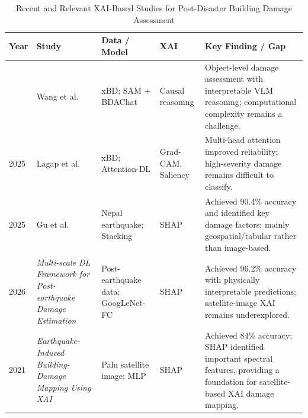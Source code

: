 \documentclass[conference]{IEEEtran}
\begin{document}

\begin{table}[t]
\centering
\caption{Recent and Relevant XAI-Based Studies for Post-Disaster Building Damage Assessment}
\label{tab:xai_literature}
\renewcommand{\arraystretch}{1.15}
\setlength{\tabcolsep}{2.5pt}

\begin{tabularx}{\columnwidth}{
    >{\centering\arraybackslash}p{0.5cm}
    >{\RaggedRight\arraybackslash}p{1.8cm}
    >{\RaggedRight\arraybackslash}p{1.8cm}
    >{\RaggedRight\arraybackslash}p{0.9cm}
    >{\RaggedRight\arraybackslash}X
}

\toprule
\textbf{Year} &
\textbf{Study} &
\textbf{Data / Model} &
\textbf{XAI} &
\textbf{Key Finding / Gap} \\
\midrule

2026 &
Wang et al. \cite{wang2026bda} &
xBD; SAM + BDAChat &
Causal reasoning &
Object-level damage assessment with interpretable VLM reasoning; computational complexity remains a challenge. \\

\midrule

2025 &
Lagap et al. \cite{lagap2025xai} &
xBD; Attention-DL &
Grad-CAM, Saliency &
Multi-head attention improved reliability; high-severity damage remains difficult to classify. \\

\midrule

2025 &
Gu et al. \cite{gu2025seismic} &
Nepal earthquake; Stacking &
SHAP &
Achieved 90.4\% accuracy and identified key damage factors; mainly geospatial/tabular rather than image-based. \\

\midrule

2026 &
\textit{Multi-scale DL Framework for Post-earthquake Damage Estimation} \cite{multiscale2026} &
Post-earthquake data; GoogLeNet-FC &
SHAP &
Achieved 96.2\% accuracy with physically interpretable predictions; satellite-image XAI remains underexplored. \\

\midrule

2021 &
\textit{Earthquake-Induced Building-Damage Mapping Using XAI} \cite{khorram2021xai} &
Palu satellite image; MLP &
SHAP &
Achieved 84\% accuracy; SHAP identified important spectral features, providing a foundation for satellite-based XAI damage mapping. \\

\bottomrule
\end{tabularx}
\end{table}
\end{document}

